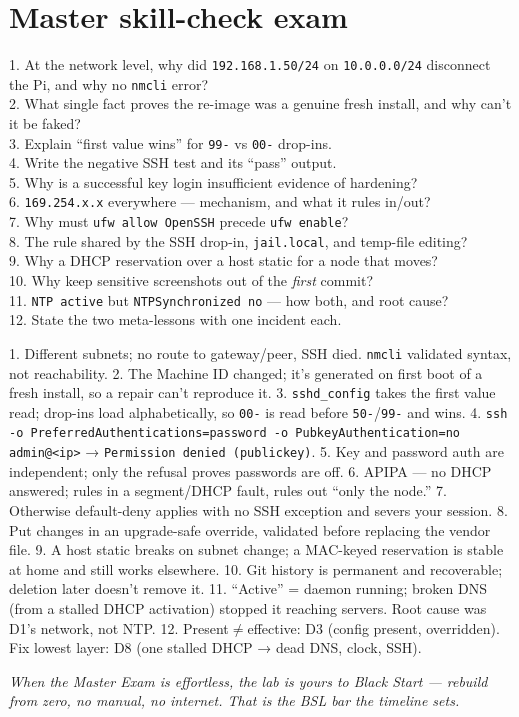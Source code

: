 \documentclass[11pt,a4paper]{article}
\begin{document}
\section{Master skill-check exam}\label{sec:exam}
\begin{skillq}
1. At the network level, why did \texttt{192.168.1.50/24} on \texttt{10.0.0.0/24} disconnect the Pi, and why no \texttt{nmcli} error?\\
2. What single fact proves the re-image was a genuine fresh install, and why can't it be faked?\\
3. Explain ``first value wins'' for \texttt{99-} vs \texttt{00-} drop-ins.\\
4. Write the negative SSH test and its ``pass'' output.\\
5. Why is a successful key login insufficient evidence of hardening?\\
6. \texttt{169.254.x.x} everywhere — mechanism, and what it rules in/out?\\
7. Why must \texttt{ufw allow OpenSSH} precede \texttt{ufw enable}?\\
8. The rule shared by the SSH drop-in, \texttt{jail.local}, and temp-file editing?\\
9. Why a DHCP reservation over a host static for a node that moves?\\
10. Why keep sensitive screenshots out of the \emph{first} commit?\\
11. \texttt{NTP active} but \texttt{NTPSynchronized no} — how both, and root cause?\\
12. State the two meta-lessons with one incident each.
\end{skillq}
\begin{skilla}
1. Different subnets; no route to gateway/peer, SSH died. \texttt{nmcli} validated syntax, not reachability.
2. The Machine ID changed; it's generated on first boot of a fresh install, so a repair can't reproduce it.
3. \texttt{sshd\_config} takes the first value read; drop-ins load alphabetically, so \texttt{00-} is read before \texttt{50-}/\texttt{99-} and wins.
4. \texttt{ssh -o PreferredAuthentications=password -o PubkeyAuthentication=no admin@<ip>} → \texttt{Permission denied (publickey)}.
5. Key and password auth are independent; only the refusal proves passwords are off.
6. APIPA — no DHCP answered; rules in a segment/DHCP fault, rules out ``only the node.''
7. Otherwise default-deny applies with no SSH exception and severs your session.
8. Put changes in an upgrade-safe override, validated before replacing the vendor file.
9. A host static breaks on subnet change; a MAC-keyed reservation is stable at home and still works elsewhere.
10. Git history is permanent and recoverable; deletion later doesn't remove it.
11. ``Active'' = daemon running; broken DNS (from a stalled DHCP activation) stopped it reaching servers. Root cause was D1's network, not NTP.
12. Present$\ne$effective: D3 (config present, overridden). Fix lowest layer: D8 (one stalled DHCP → dead DNS, clock, SSH).
\end{skilla}

\vfill
\begin{center}\small\itshape\color{dcgray}
When the Master Exam is effortless, the lab is yours to Black Start — rebuild
from zero, no manual, no internet. That is the BSL bar the timeline sets.
\end{center}
\end{document}
